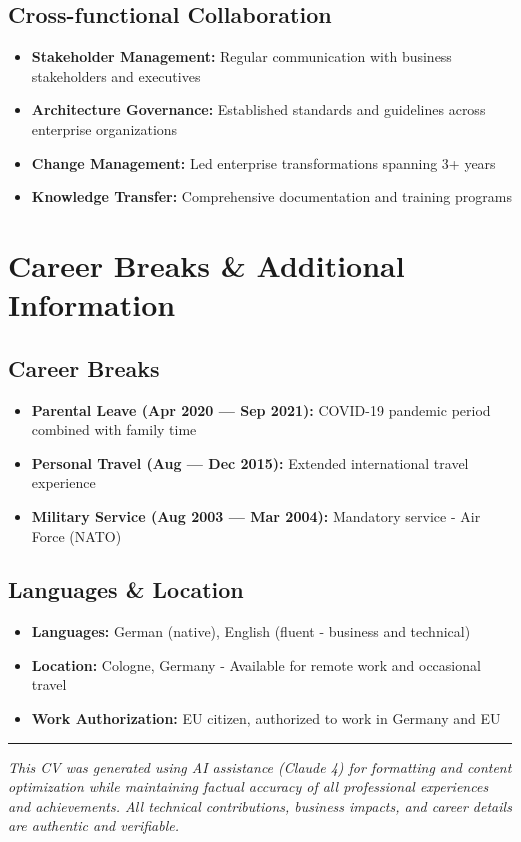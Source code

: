 \documentclass[11pt,a4paper]{article}
\begin{document}
\subsection{Cross-functional Collaboration}
\begin{itemize}
    \item \textbf{Stakeholder Management:} Regular communication with business stakeholders and executives
    \item \textbf{Architecture Governance:} Established standards and guidelines across enterprise organizations
    \item \textbf{Change Management:} Led enterprise transformations spanning 3+ years
    \item \textbf{Knowledge Transfer:} Comprehensive documentation and training programs
\end{itemize}

\section{Career Breaks \& Additional Information}

\subsection{Career Breaks}
\begin{itemize}
    \item \textbf{Parental Leave (Apr 2020 — Sep 2021):} COVID-19 pandemic period combined with family time
    \item \textbf{Personal Travel (Aug — Dec 2015):} Extended international travel experience
    \item \textbf{Military Service (Aug 2003 — Mar 2004):} Mandatory service - Air Force (NATO)
\end{itemize}

\subsection{Languages \& Location}
\begin{itemize}
    \item \textbf{Languages:} German (native), English (fluent - business and technical)
    \item \textbf{Location:} Cologne, Germany - Available for remote work and occasional travel
    \item \textbf{Work Authorization:} EU citizen, authorized to work in Germany and EU
\end{itemize}

\vspace{12pt}

\hrule

\vspace{8pt}

\footnotesize
\textit{This CV was generated using AI assistance (Claude 4) for formatting and content optimization while maintaining factual accuracy of all professional experiences and achievements. All technical contributions, business impacts, and career details are authentic and verifiable.}
\end{document}
